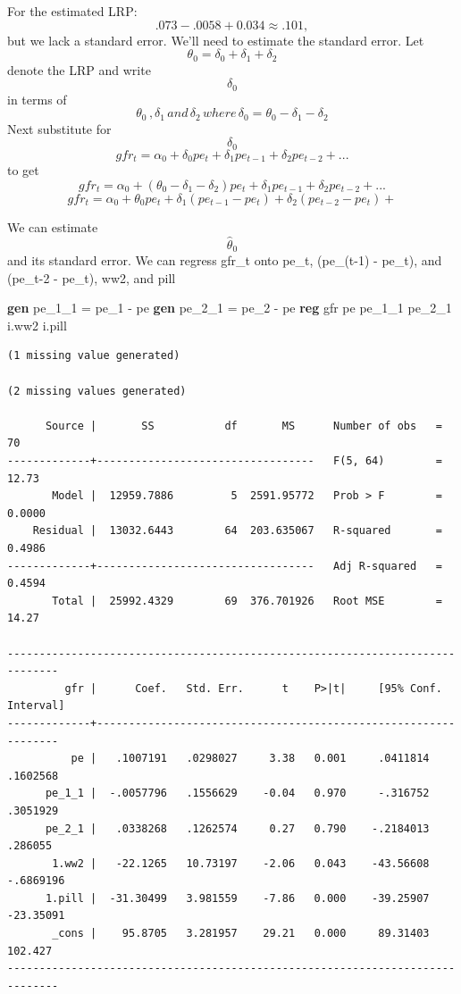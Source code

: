 \documentclass[
]{book}
\newenvironment{Shaded}{\begin{snugshade}}{\end{snugshade}}
\newcommand{\KeywordTok}[1]{\textcolor[rgb]{0.13,0.29,0.53}{\textbf{#1}}}
\newcommand{\NormalTok}[1]{#1}
\begin{document}
For the estimated LRP: \[ .073-.0058+0.034 \approx .101, \] but we lack a standard error.
We'll need to estimate the standard error.
Let \[ \theta_0=\delta_0+\delta_1+\delta_2 \] denote the LRP and write \[ \delta_0 \]
in terms of \[ \theta_0 \, , \delta_1 \, and \, \delta_2 \, where \, \delta_0 = \theta_0 - \delta_1 - \delta_2 \]
Next substitute for \[ \delta_0 \]
\[ gfr_t = \alpha_0 + \delta_0 pe_t + \delta_1 pe_{t-1} + \delta_2 pe_{t-2} + ... \]
to get
\[ gfr_t = \alpha_0 + (\theta_0 - \delta_1 - \delta_2)pe_t + \delta_1 pe_{t-1} + \delta_2 pe_{t-2} + ... \]
\[ gfr_t = \alpha_0 + \theta_0 pe_t + \delta_1 (pe_{t-1} - pe_t) + \delta_2 (pe_{t-2} - pe_t) + \]

We can estimate \[ \hat{\theta}_{0} \] and its standard error.
We can regress gfr\_t onto pe\_t, (pe\_(t-1) - pe\_t), and (pe\_t-2 - pe\_t), ww2, and pill

\begin{Shaded}
\begin{Highlighting}[]
\KeywordTok{gen}\NormalTok{ pe\_1\_1 = pe\_1 {-} pe}
\KeywordTok{gen}\NormalTok{ pe\_2\_1 = pe\_2 {-} pe}
\KeywordTok{reg}\NormalTok{ gfr pe pe\_1\_1 pe\_2\_1 i.ww2 i.pill}
\end{Highlighting}
\end{Shaded}

\begin{verbatim}
(1 missing value generated)

(2 missing values generated)

      Source |       SS           df       MS      Number of obs   =        70
-------------+----------------------------------   F(5, 64)        =     12.73
       Model |  12959.7886         5  2591.95772   Prob > F        =    0.0000
    Residual |  13032.6443        64  203.635067   R-squared       =    0.4986
-------------+----------------------------------   Adj R-squared   =    0.4594
       Total |  25992.4329        69  376.701926   Root MSE        =     14.27

------------------------------------------------------------------------------
         gfr |      Coef.   Std. Err.      t    P>|t|     [95% Conf. Interval]
-------------+----------------------------------------------------------------
          pe |   .1007191   .0298027     3.38   0.001     .0411814    .1602568
      pe_1_1 |  -.0057796   .1556629    -0.04   0.970     -.316752    .3051929
      pe_2_1 |   .0338268   .1262574     0.27   0.790    -.2184013     .286055
       1.ww2 |   -22.1265   10.73197    -2.06   0.043    -43.56608   -.6869196
      1.pill |  -31.30499   3.981559    -7.86   0.000    -39.25907   -23.35091
       _cons |    95.8705   3.281957    29.21   0.000     89.31403     102.427
------------------------------------------------------------------------------
\end{verbatim}
\end{document}
